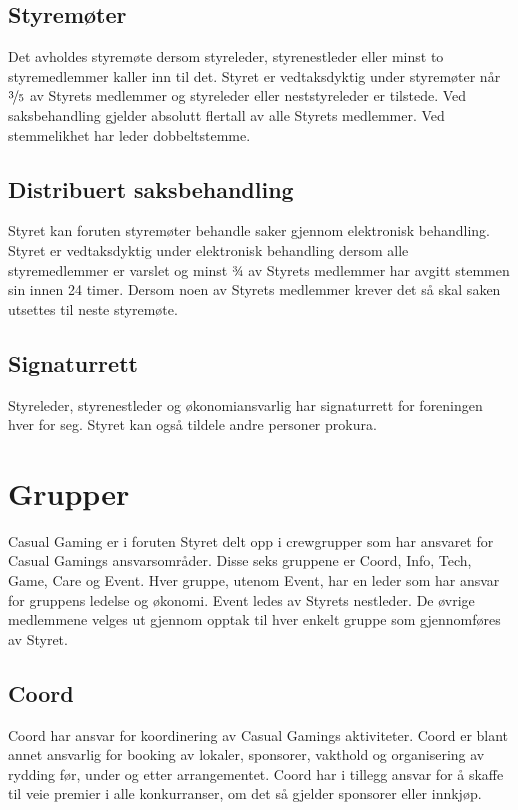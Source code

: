 \subsection{Styremøter}
Det avholdes styremøte dersom styreleder, styrenestleder eller minst to styremedlemmer kaller inn til det. Styret er vedtaksdyktig under styremøter når $\nicefrac{3}{5}$ av Styrets medlemmer og styreleder eller neststyreleder er tilstede. Ved saksbehandling gjelder absolutt flertall av alle Styrets medlemmer. Ved stemmelikhet har leder dobbeltstemme.

\subsection{Distribuert saksbehandling}
Styret kan foruten styremøter behandle saker gjennom elektronisk behandling. Styret er vedtaksdyktig under elektronisk behandling dersom alle styremedlemmer er varslet og minst ¾ av Styrets medlemmer har avgitt stemmen sin innen 24 timer. Dersom noen av Styrets medlemmer krever det så skal saken utsettes til neste styremøte.

\subsection{Signaturrett}
Styreleder, styrenestleder og økonomiansvarlig har signaturrett for foreningen hver for seg. Styret kan også tildele andre personer prokura.

\section{Grupper}
Casual Gaming er i foruten Styret delt opp i crewgrupper som har ansvaret for Casual Gamings ansvarsområder. Disse seks gruppene er Coord, Info, Tech, Game, Care og Event. Hver gruppe, utenom Event, har en leder som har ansvar for gruppens ledelse og økonomi. Event ledes av Styrets nestleder. De øvrige medlemmene velges ut gjennom opptak til hver enkelt gruppe som gjennomføres av Styret.

\subsection{Coord}
Coord har ansvar for koordinering av Casual Gamings aktiviteter. Coord er blant annet ansvarlig for booking av lokaler, sponsorer, vakthold og organisering av rydding før, under og etter arrangementet. Coord har i tillegg ansvar for å skaffe til veie premier i alle konkurranser, om det så gjelder sponsorer eller innkjøp.

